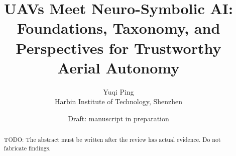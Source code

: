\documentclass[11pt]{article}
\title{UAVs Meet Neuro-Symbolic AI: Foundations, Taxonomy, and Perspectives for Trustworthy Aerial Autonomy}
\author{Yuqi Ping\\Harbin Institute of Technology, Shenzhen}
\date{Draft: manuscript in preparation}
\begin{document}
\maketitle

\begin{abstract}
TODO: The abstract must be written after the review has actual evidence. Do not
fabricate findings.
\end{abstract}












\end{document}
